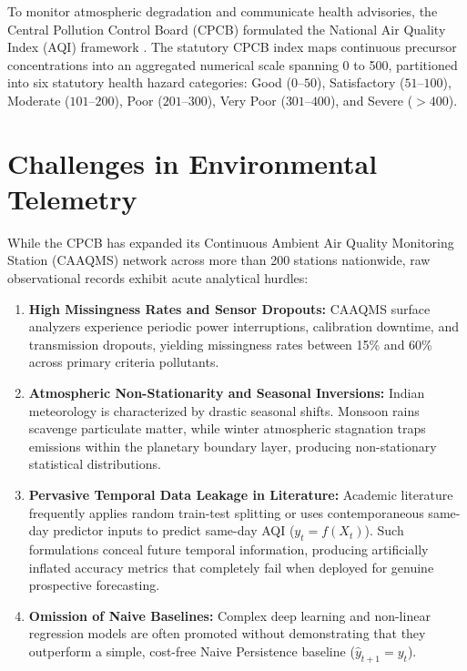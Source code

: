 \documentclass[11pt,a4paper]{report}
\begin{document}
To monitor atmospheric degradation and communicate health advisories, the Central Pollution Control Board (CPCB) formulated the National Air Quality Index (AQI) framework \cite{cpcb2014national}. The statutory CPCB index maps continuous precursor concentrations into an aggregated numerical scale spanning 0 to 500, partitioned into six statutory health hazard categories: Good ($0$--$50$), Satisfactory ($51$--$100$), Moderate ($101$--$200$), Poor ($201$--$300$), Very Poor ($301$--$400$), and Severe ($>400$).

\section{Challenges in Environmental Telemetry}
While the CPCB has expanded its Continuous Ambient Air Quality Monitoring Station (CAAQMS) network across more than 200 stations nationwide, raw observational records exhibit acute analytical hurdles:
\begin{enumerate}
    \item \textbf{High Missingness Rates and Sensor Dropouts:} CAAQMS surface analyzers experience periodic power interruptions, calibration downtime, and transmission dropouts, yielding missingness rates between 15\% and 60\% across primary criteria pollutants.
    \item \textbf{Atmospheric Non-Stationarity and Seasonal Inversions:} Indian meteorology is characterized by drastic seasonal shifts. Monsoon rains scavenge particulate matter, while winter atmospheric stagnation traps emissions within the planetary boundary layer, producing non-stationary statistical distributions.
    \item \textbf{Pervasive Temporal Data Leakage in Literature:} Academic literature frequently applies random train-test splitting or uses contemporaneous same-day predictor inputs to predict same-day AQI ($y_t = f(X_t)$). Such formulations conceal future temporal information, producing artificially inflated accuracy metrics that completely fail when deployed for genuine prospective forecasting.
    \item \textbf{Omission of Naive Baselines:} Complex deep learning and non-linear regression models are often promoted without demonstrating that they outperform a simple, cost-free Naive Persistence baseline ($\widehat{y}_{t+1} = y_t$).
\end{enumerate}
\end{document}
